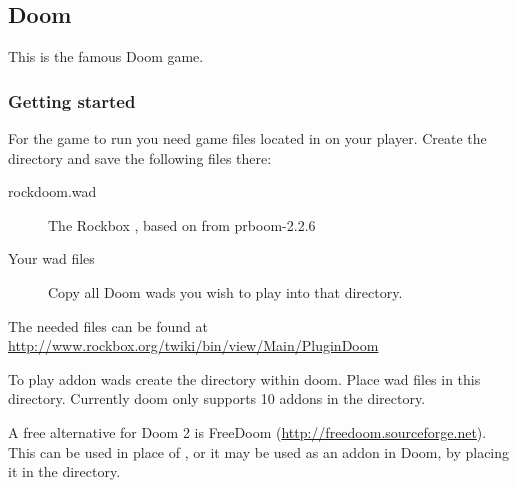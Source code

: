 \subsection{Doom}
This is the famous Doom game.

\subsubsection{Getting started}
For the game to run you need  game files located in
 on your player. Create the directory and save the
following files there:
\begin{description}
\item[rockdoom.wad] The Rockbox , based on 
from prboom-2.2.6
\item[Your wad files] Copy all Doom wads you wish to play into that directory.
\end{description}
The needed files can be found at
\url{http://www.rockbox.org/twiki/bin/view/Main/PluginDoom}

To play addon wads create the  directory within doom. 
Place wad files in this directory. Currently doom only supports 10 addons 
in the directory.

A free alternative for Doom 2 is FreeDoom (\url{http://freedoom.sourceforge.net}).
This can be used in place of , or it may be used as an addon in 
Doom, by placing it in the  directory.


